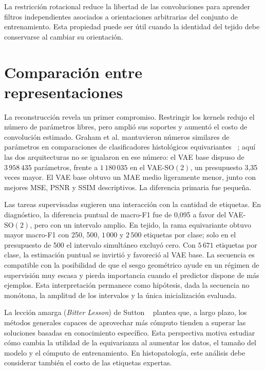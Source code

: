 La restricción rotacional reduce la libertad de las convoluciones para aprender
filtros independientes asociados a orientaciones arbitrarias del conjunto de
entrenamiento. Esta propiedad puede ser útil cuando la identidad del tejido
debe conservarse al cambiar su orientación.

\section{Comparación entre representaciones}

La reconstrucción revela un primer compromiso. Restringir los kernels redujo
el número de parámetros libres, pero amplió sus soportes y aumentó el costo de
convolución estimado. Graham et al. mantuvieron números similares de parámetros en
comparaciones de clasificadores histológicos equivariantes
~\cite{graham_dense_2020}; aquí las dos arquitecturas no se igualaron en
ese número: el VAE base dispuso de \(3\,958\,435\) parámetros, frente a
\(1\,180\,035\) en el VAE-\(\mathrm{SO}(2)\), un presupuesto 3,35 veces mayor.
El VAE base obtuvo un MAE medio ligeramente menor, junto
con mejores MSE, PSNR y SSIM descriptivos. La diferencia primaria fue pequeña.

Las tareas supervisadas sugieren una interacción con la cantidad de etiquetas.
En diagnóstico, la diferencia puntual de macro-F1 fue de 0,095 a favor del
VAE-\(\mathrm{SO}(2)\), pero con un intervalo amplio. En tejido, la rama
equivariante obtuvo mayor macro-F1 con 250, 500, \(1\,000\) y \(2\,500\)
etiquetas por clase; solo en el presupuesto de 500 el intervalo simultáneo
excluyó cero. Con \(5\,671\) etiquetas por clase, la estimación
puntual se invirtió y favoreció al VAE base. La secuencia es compatible con la
posibilidad de que el sesgo geométrico ayude en un régimen de supervisión muy
escasa y pierda importancia cuando el predictor dispone de más ejemplos. Esta
interpretación permanece como hipótesis, dada la secuencia no monótona, la
amplitud de los intervalos y la única inicialización evaluada.

La lección amarga (\emph{Bitter Lesson}) de Sutton
~\cite{sutton_bitter_lesson_2019} plantea que, a largo plazo, los métodos
generales capaces de aprovechar más cómputo tienden a superar las soluciones
basadas en conocimiento específico. Esta perspectiva motiva estudiar cómo
cambia la utilidad de la equivarianza al aumentar los datos, el tamaño del
modelo y el cómputo de entrenamiento. En histopatología, este análisis debe
considerar también el costo de las etiquetas expertas.

